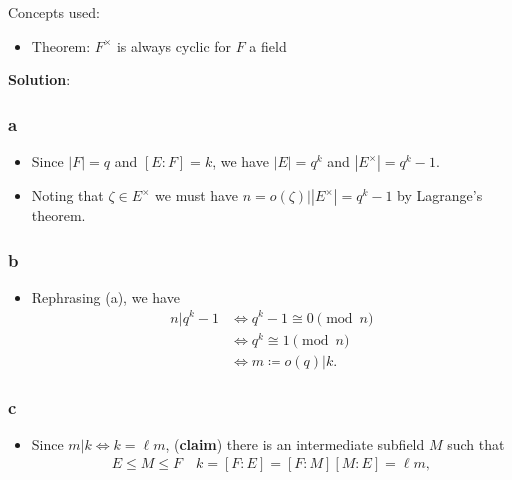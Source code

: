 \begin{solution}

Concepts used:

\begin{itemize}
\tightlist
\item
  Theorem: \(F^{\times}\) is always cyclic for \(F\) a field
\end{itemize}

\textbf{Solution}:

\hypertarget{a-52}{%
\subsubsection{a}\label{a-52}}

\begin{itemize}
\item
  Since \({\left\lvert {F} \right\rvert} = q\) and \([E:F] = k\), we
  have \({\left\lvert {E} \right\rvert} = q^k\) and
  \({\left\lvert {E^{\times}} \right\rvert} = q^k-1\).
\item
  Noting that \(\zeta \in E^{\times}\) we must have
  \(n = o(\zeta) \mathrel{\Big|}{\left\lvert {E^{\times}} \right\rvert} = q^k-1\)
  by Lagrange's theorem.
\end{itemize}

\hypertarget{b-42}{%
\subsubsection{b}\label{b-42}}

\begin{itemize}
\tightlist
\item
  Rephrasing (a), we have
  \begin{align*}
  n \mathrel{\Big|}q^k-1 
  &\iff q^k-1 \cong 0 \pmod n \\
  &\iff q^k \cong 1 \pmod n \\
  &\iff m \coloneqq o(q) \mathrel{\Big|}k
  .\end{align*}
\end{itemize}

\hypertarget{c-28}{%
\subsubsection{c}\label{c-28}}

\begin{itemize}
\item
  Since \(m\mathrel{\Big|}k \iff k = \ell m\), (\textbf{claim}) there is
  an intermediate subfield \(M\) such that
  \begin{align*}
  E \leq M \leq F \quad k = [F:E] = [F:M] [M:E] = \ell m
  ,\end{align*}


\end{itemize}
\end{solution}
